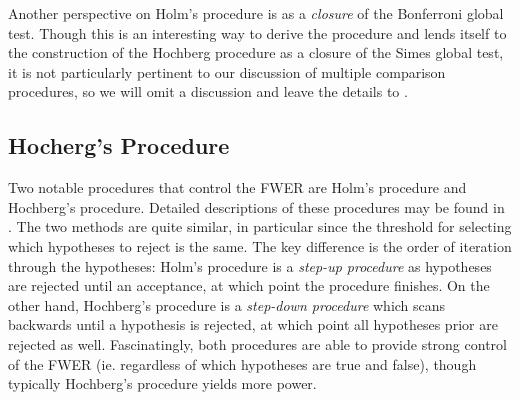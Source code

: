 \documentclass[11pt,reqno]{report}
\theoremstyle{definition}
\numberwithin{equation}{section}
\begin{document}
\begin{note*}
Another perspective on Holm's procedure is as a \emph{closure} of the Bonferroni global test. Though this is an interesting way to derive the procedure and lends itself to the construction of the Hochberg procedure as a closure of the Simes global test, it is not particularly pertinent to our discussion of multiple comparison procedures, so we will omit a discussion and leave the details to \cite{stat300}.
\end{note*}


\subsection{Hocherg's Procedure}




Two notable procedures that control the FWER are Holm's procedure and Hochberg's procedure. Detailed descriptions of these procedures may be found in \cite{stat300}. The two methods are quite similar, in particular since the threshold for selecting which hypotheses to reject is the same. The key difference is the order of iteration through the hypotheses: Holm's procedure is a \emph{step-up procedure} as hypotheses are rejected until an acceptance, at which point the procedure finishes. On the other hand, Hochberg's procedure is a \emph{step-down procedure} which scans backwards until a hypothesis is rejected, at which point all hypotheses prior are rejected as well. Fascinatingly, both procedures are able to provide strong control of the FWER (ie. regardless of which hypotheses are true and false), though typically Hochberg's procedure yields more power.
\end{document}
